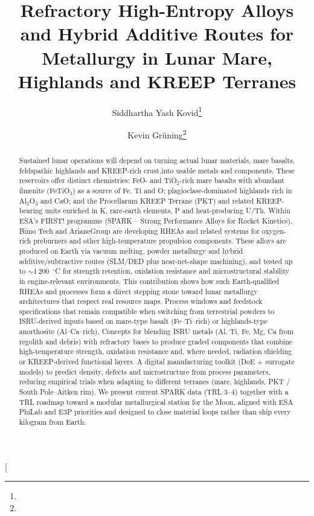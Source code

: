 \documentclass[11pt,a4paper]{article}
\title{\GSSemiBold Refractory High-Entropy Alloys and Hybrid Additive
Routes for Metallurgy in Lunar Mare, Highlands and KREEP Terranes}
\author[1]{Siddhartha Yash Kovid\thanks{\email{s.kovid@bimotech.pl}}}
\author[1]{Kevin Gr\"uning\thanks{\email{k.gruening@bimotech.pl}}}
\affil[1]{Bimo Tech Sp.\ Z O.\ O., Wroclaw, Poland}
\date{}
\newif\ifcamera
\begin{document}
\ifcamera
\makeatletter
\twocolumn[
\begin{@twocolumnfalse}
\maketitle
\begin{abstract}\small
Sustained lunar operations will depend on turning actual lunar materials, mare basalts, feldspathic highlands and KREEP-rich crust,into usable metals and components. These reservoirs offer distinct chemistries: FeO- and TiO$_2$-rich mare basalts with abundant ilmenite (FeTiO$_3$) as a source of Fe, Ti and O; plagioclase-dominated highlands rich in Al$_2$O$_3$ and CaO; and the Procellarum KREEP Terrane (PKT) and related KREEP-bearing units enriched in K, rare-earth elements, P and heat-producing U/Th. Within ESA's FIRST! programme (SPARK -- Strong Performance Alloys for Rocket Kinetics), Bimo Tech and ArianeGroup are developing RHEAs and related systems for oxygen-rich preburners and other high-temperature propulsion components. These alloys are produced on Earth via vacuum melting, powder metallurgy and hybrid additive/subtractive routes (SLM/DED plus near-net-shape machining), and tested up to $\sim$1\,200~$^\circ$C for strength retention, oxidation resistance and microstructural stability in engine-relevant environments. This contribution shows how such Earth-qualified RHEAs and processes form a direct stepping stone toward lunar metallurgy architectures that respect real resource maps. Process windows and feedstock specifications that remain compatible when switching from terrestrial powders to ISRU-derived inputs based on mare-type basalt (Fe--Ti--rich) or highlands-type anorthosite (Al--Ca--rich). Concepts for blending ISRU metals (Al, Ti, Fe, Mg, Ca from regolith and debris) with refractory bases to produce graded components that combine high-temperature strength, oxidation resistance and, where needed, radiation shielding or KREEP-derived functional layers. A digital manufacturing toolkit (DoE + surrogate models) to predict density, defects and microstructure from process parameters, reducing empirical trials when adapting to different terranes (mare, highlands, PKT / South Pole--Aitken rim). We present current SPARK data (TRL 3--4) together with a TRL roadmap toward a modular metallurgical station for the Moon, aligned with ESA PhiLab and E3P priorities and designed to close material loops rather than ship every kilogram from Earth.
\end{abstract}
\vspace{0.4em}
\end{@twocolumnfalse}
\end{document}
